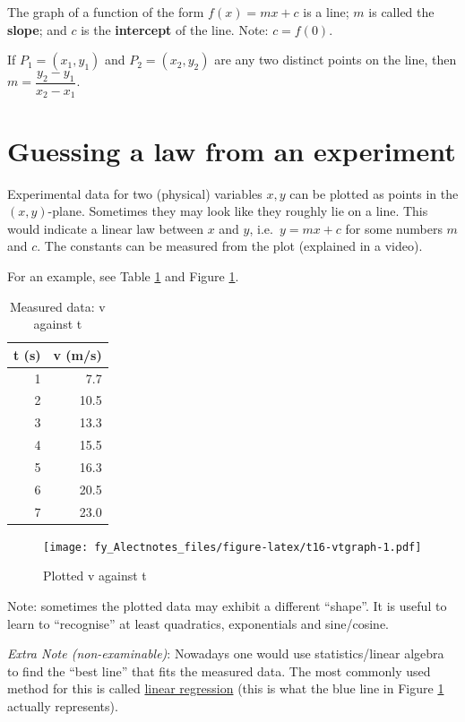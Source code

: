 \documentclass[
  12pt,
  oneside]{book}
\theoremstyle{definition}
\theoremstyle{definition}
\theoremstyle{definition}
\theoremstyle{definition}
\theoremstyle{remark}
\begin{document}
The graph of a function of the form \(f(x)=mx+c\) is a line; \(m\) is called the \textbf{slope}; and \(c\) is the \textbf{intercept} of the line. Note: \(c=f(0)\).

If \(P_1=(x_1,y_1)\) and \(P_2=(x_2,y_2)\) are any two distinct points on the line, then \(m=\dfrac{y_2-y_1}{x_2-x_1}\).

\hypertarget{guessing-a-law-from-an-experiment}{%
\section{Guessing a law from an experiment}\label{guessing-a-law-from-an-experiment}}

Experimental data for two (physical) variables \(x,y\) can be plotted as points
in the \((x,y)\)-plane. Sometimes they may look like they roughly lie on a line.
This would indicate a linear law between \(x\) and \(y\), i.e.~\(y=mx+c\) for some numbers \(m\) and \(c\). The constants can be measured from the plot (explained in a video).

For an example, see Table \ref{tab:t16-vttable} and Figure \ref{fig:t16-vtgraph}.

\begin{table}

\caption{\label{tab:t16-vttable}Measured data: v against t}
\centering
\begin{tabular}[t]{r|r}
\hline
t (s) & v (m/s)\\
\hline
1 & 7.7\\
\hline
2 & 10.5\\
\hline
3 & 13.3\\
\hline
4 & 15.5\\
\hline
5 & 16.3\\
\hline
6 & 20.5\\
\hline
7 & 23.0\\
\hline
\end{tabular}
\end{table}

\begin{figure}
\centering
\texttt{[image: fy\_Alectnotes\_files/figure-latex/t16-vtgraph-1.pdf]}
\caption{\label{fig:t16-vtgraph}Plotted v against t}
\end{figure}

Note: sometimes the plotted data may exhibit a different ``shape''. It is useful
to learn to ``recognise'' at least quadratics, exponentials and sine/cosine.

\emph{Extra Note (non-examinable)}: Nowadays one would use statistics/linear algebra to find the ``best line'' that fits the measured data. The most commonly used method for this is called \href{https://en.wikipedia.org/wiki/Linear_regression}{linear regression} (this is what the blue line in Figure \ref{fig:t16-vtgraph} actually represents).
\end{document}
